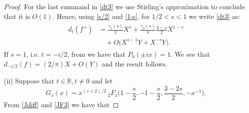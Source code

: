 \documentclass[a4paper,11pt]{amsart}
\theoremstyle{definition}
\begin{document}
\begin{proof}
For the last summand in \eqref{dt3} we use Stirling's approximation to conclude that it is $O(1)$.
Hence, using \eqref{s/2} and \eqref{1-s}, for $1/2<s<1$ we write \eqref{dt3} as:
\begin{align}
    \begin{split}
        d_t(f^{+})&= \frac{\gamma_1(s)}{\pi}X^s+\frac{\gamma_2(s)}{\pi}\frac{3-s}{2}X^{1-s}\\
        &\quad +O\Big(X^{s-1}Y+X^{-s}Y\Big).
    \end{split}
\end{align}
If $s=1$, i.e. $t=-i/2$, from \cite[Eq.8.711.1] {gradshteyn2007} we have that $P_0(\pm ix)=1$. We see that $d_{-i/2}(f)=(2/\pi)X+O(Y)$ and the result follows.


(ii) Suppose that $t\in \mathbb{R}, t\neq 0$ and let 
$$G_s(x)=x^{(s+2)/2}\: _2F_1\Big(1-\frac{s}{2},-1-\frac{s}{2},\frac{3-2s}{2},-x^{-1}\Big).$$
From \eqref{Jdiff} and \eqref{JF3} we have that 


\end{proof}
\end{document}

